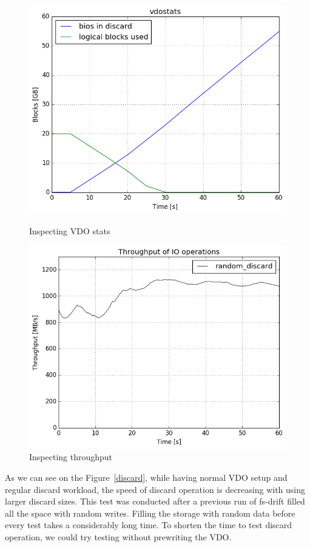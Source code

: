 \documentclass[
  color, %
  table, %
  lof,   %
  lot,   %
]{fithesis3}
\begin{document}
\begin{figure}[!htb]
        \centering
        \includegraphics[width=\textwidth]{../results/discards/full_VDO/report/tar_184_vdostats}
\caption[Discards]{Inspecting VDO stats}
\label{fig:discard-full-vdostats}
        \centering
        \includegraphics[width=\textwidth]{../results/discards/full_VDO/report/tar_184_bw.png}
\caption[Discards]{Inspecting throughput}
\label{fig:discard-full-througput}
\end{figure}

As we can see on the Figure~\ref{discard}, while having normal VDO setup and regular discard workload, the speed of discard operation is decreasing with using larger discard sizes. This test was conducted after a previous run of fs-drift filled all the space with random writes. Filling the storage with random data before every test takes a considerably long time. To shorten the time to test discard operation, we could try testing without prewriting the VDO.
\end{document}
